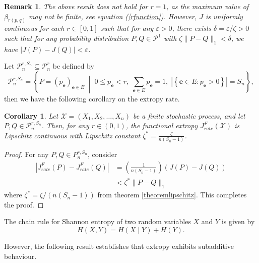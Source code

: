 \documentclass[pdflatex]{sn-jnl}%
\theoremstyle{thmstyleone}
\newtheorem{corollary}{Corollary}
\theoremstyle{thmstyletwo}%
\theoremstyle{thmstylethree}%
\newtheorem{remark}{Remark}%
\begin{document}
\begin{remark}
The above result does not hold for $r=1$, as the maximum value of ${\beta_{r(p,q)}}$ may not be finite, see equation (\ref{rfunction}). However, \( J \) is uniformly continuous for each \(r\in [0,1] \) such that for any \( \varepsilon > 0 \), there exists \( \delta = \varepsilon / \zeta > 0 \) such that for any probability distribution \( P, Q \in \mathcal{P}^1\) with \(\zeta \|P - Q\|_1 < \delta \), we have \( |J(P)-J(Q)| < \varepsilon \).
\end{remark}
\noindent Let $\mathcal{P}_n^{r,S_n}\subseteq \mathcal{P}_n^r$ be defined by 
\begin{equation}
    \mathcal{P}_n^{r,S_n} = \left\{ P = (p_{\mathbf{e}})_{\mathbf{e} \in E} \;\middle|\; 0 \le p_{\mathbf{e}} < r,\; \sum_{\mathbf{e} \in E} p_{\mathbf{e}} = 1,\; \left| \left\{ \mathbf{e} \in E : p_{\mathbf{e}} 
    > 0 \right\} \right| = S_n \right\},
\end{equation}
then we have the following corollary on the extropy rate.
\begin{corollary}
    Let $\mathcal{X} = (X_1, X_2, \ldots, X_n)$ be a finite stochastic process, and let $P, Q \in \mathcal{P}_{n}^{r,S_n}$. Then, for any $r\in (0,1)$, the functional extropy $J_{rate}^F(\mathcal{X})$ is Lipschitz continuous with Lipschitz constant $\zeta^{*}=\frac{\zeta}{n(S_n-1)}$.
\end{corollary}
\begin{proof}
    For any $P,Q \in P_{n}^{r,S_n}$, consider 
    \begin{equation}
    \begin{split}
        |J_{rate}^F(P)-J_{rate}^F(Q)| &= \left(\frac{1}{n(S_n-1)} \right)(J(P)-J(Q)) \\
        & < \zeta^{*}\|P - Q\|_1
    \end{split}
    \end{equation}
    where $\zeta^{*}=\zeta/{\left( n(S_n-1) \right)}$ from theorem \ref{theoremlipschitz}. This completes the proof.
\end{proof}



\noindent The chain rule for Shannon entropy of two random variables \( X \) and \( Y \) is given by
\[
H(X, Y) = H(X \mid Y) + H(Y).
\]

However, the following result establishes that extropy exhibits subadditive behaviour.
\end{document}
